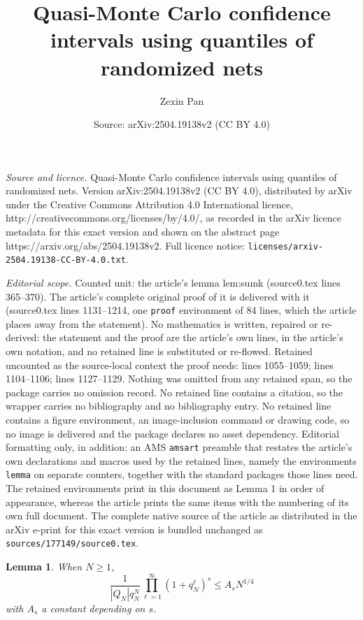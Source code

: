 \documentclass[10pt,a4paper]{amsart}
\title{Quasi-Monte Carlo confidence intervals using quantiles of randomized nets}
\author{Zexin Pan}
\date{Source: arXiv:2504.19138v2 (CC BY 4.0)}
\newtheorem{lemma}{Lemma}
\renewcommand{\geq}{\geqslant}
\renewcommand{\leq}{\leqslant}
\begin{document}
\maketitle

\noindent\emph{Source and licence.} Quasi-Monte Carlo confidence intervals using quantiles of randomized nets. Version arXiv:2504.19138v2 (CC BY 4.0), distributed by arXiv under the Creative Commons Attribution 4.0 International licence, http://creativecommons.org/licenses/by/4.0/, as recorded in the arXiv licence metadata for this exact version and shown on the abstract page https://arxiv.org/abs/2504.19138v2. Full licence notice: \texttt{licenses/arxiv-2504.19138-CC-BY-4.0.txt}.\par\smallskip

\noindent\textit{Editorial scope.} Counted unit: the article's lemma lem:sumk (source0.tex lines 365--370). The article's complete original proof of it is delivered with it (source0.tex lines 1131--1214, one \texttt{proof} environment of 84 lines, which the article places away from the statement). No mathematics is written, repaired or re-derived: the statement and the proof are the article's own lines, in the article's own notation, and no retained line is substituted or re-flowed.  Retained uncounted as the source-local context the proof needs: lines 1055--1059; lines 1104--1106; lines 1127--1129.  Nothing was omitted from any retained span, so the package carries no omission record.  No retained line contains a citation, so the wrapper carries no bibliography and no bibliography entry.  No retained line contains a figure environment, an image-inclusion command or drawing code, so no image is delivered and the package declares no asset dependency.  Editorial formatting only, in addition: an AMS \texttt{amsart} preamble that restates the article's own declarations and macros used by the retained lines, namely the environments \texttt{lemma} on separate counters, together with the standard packages those lines need.  The retained environments print in this document as Lemma 1 in order of appearance, whereas the article prints the same items with the numbering of its own full document.  The complete native source of the article as distributed in the arXiv e-print for this exact version is bundled unchanged as \texttt{sources/177149/source0.tex}.
\begin{lemma}\label{lem:likehoodratio} 
When $N\geq 1$,
    $$\frac{1}{|Q_N|q_N^N}\prod_{\ell=1}^\infty (1+q_N^\ell)^s\leq A_s N^{1/4}$$
    with $A_s$ a constant depending on $s$.
\end{lemma}
\end{document}
